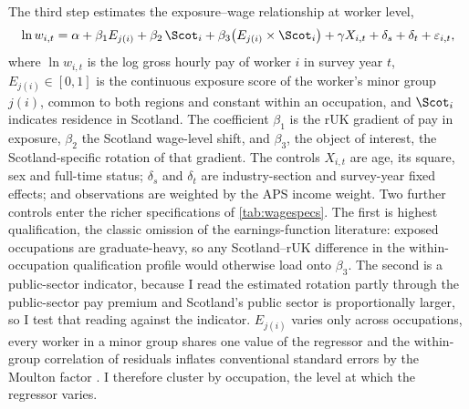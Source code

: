 The third step estimates the exposure--wage relationship at worker level,
\begin{equation}\label{eq:wage}
\ln w_{i,t} = \alpha + \beta_1 E_{j(i)} + \beta_2\, \Scot_i +
\beta_3 \bigl( E_{j(i)} \times \Scot_i \bigr) + \gamma X_{i,t} +
\delta_s + \delta_t + \varepsilon_{i,t},
\end{equation}
where $\ln w_{i,t}$ is the log gross hourly pay of worker $i$ in survey year $t$, $E_{j(i)} \in [0,1]$ is the continuous exposure score of the worker's minor group $j(i)$, common to both regions and constant within an occupation, and $\Scot_i$ indicates residence in Scotland. The coefficient $\beta_1$ is the rUK gradient of pay in exposure, $\beta_2$ the Scotland wage-level shift, and $\beta_3$, the object of interest, the Scotland-specific rotation of that gradient. The controls $X_{i,t}$ are age, its square, sex and full-time status; $\delta_s$ and $\delta_t$ are industry-section and survey-year fixed effects; and observations are weighted by the APS income weight. Two further controls enter the richer specifications of \cref{tab:wagespecs}. The first is highest qualification, the classic omission of the earnings-function literature: exposed occupations are graduate-heavy, so any Scotland--rUK difference in the within-occupation qualification profile would otherwise load onto $\beta_3$. The second is a public-sector indicator, because I read the estimated rotation partly through the public-sector pay premium \citep{cribb2025} and Scotland's public sector is proportionally larger, so I test that reading against the indicator. $E_{j(i)}$ varies only across occupations, every worker in a minor group shares one value of the regressor and the within-group correlation of residuals inflates conventional standard errors by the Moulton factor \citep{moulton1990}. I therefore cluster by occupation, the level at which the regressor varies.